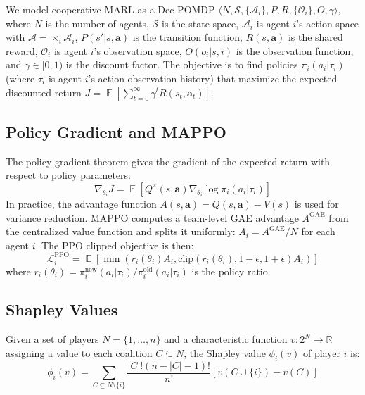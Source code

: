 \documentclass[11pt,a4paper]{article}
\DeclareMathOperator*{\E}{\mathbb{E}}
\def\R{\mathbb{R}}
\begin{document}
We model cooperative MARL as a Dec-POMDP $\langle N, \mathcal{S}, \{\mathcal{A}_i\}, P, R, \{\mathcal{O}_i\}, O, \gamma \rangle$, where $N$ is the number of agents, $\mathcal{S}$ is the state space, $\mathcal{A}_i$ is agent $i$'s action space with $\mathcal{A} = \times_i \mathcal{A}_i$, $P(s'|s,\mathbf{a})$ is the transition function, $R(s,\mathbf{a})$ is the shared reward, $\mathcal{O}_i$ is agent $i$'s observation space, $O(o_i|s,i)$ is the observation function, and $\gamma \in [0,1)$ is the discount factor. The objective is to find policies $\pi_i(a_i|\tau_i)$ (where $\tau_i$ is agent $i$'s action-observation history) that maximize the expected discounted return $J = \E[\sum_{t=0}^\infty \gamma^t R(s_t, \mathbf{a}_t)]$.

\subsection{Policy Gradient and MAPPO}

The policy gradient theorem \cite{sutton2000policy} gives the gradient of the expected return with respect to policy parameters:
\begin{equation}
\nabla_{\theta_i} J = \E\left[ Q^{\pi}(s,\mathbf{a}) \nabla_{\theta_i} \log \pi_i(a_i|\tau_i) \right]
\end{equation}
In practice, the advantage function $A(s,\mathbf{a}) = Q(s,\mathbf{a}) - V(s)$ is used for variance reduction. MAPPO computes a team-level GAE advantage $A^{\text{GAE}}$ from the centralized value function and splits it uniformly: $A_i = A^{\text{GAE}} / N$ for each agent $i$. The PPO clipped objective is then:
\begin{equation}
\mathcal{L}_i^{\text{PPO}} = \E\left[ \min\left( r_i(\theta_i) A_i, \text{clip}(r_i(\theta_i), 1-\epsilon, 1+\epsilon) A_i \right) \right]
\end{equation}
where $r_i(\theta_i) = \pi_i^{\text{new}}(a_i|\tau_i) / \pi_i^{\text{old}}(a_i|\tau_i)$ is the policy ratio.

\subsection{Shapley Values}

Given a set of players $N = \{1, \ldots, n\}$ and a characteristic function $v: 2^N \to \R$ assigning a value to each coalition $C \subseteq N$, the Shapley value $\phi_i(v)$ of player $i$ is:
\begin{equation}
\phi_i(v) = \sum_{C \subseteq N \setminus \{i\}} \frac{|C|! (n - |C| - 1)!}{n!} [v(C \cup \{i\}) - v(C)]
\end{equation}
\end{document}
